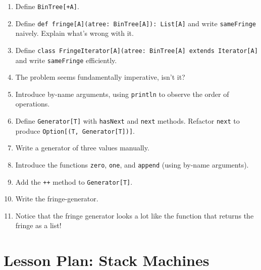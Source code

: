 \documentclass[9pt]{extbook}
\begin{document}
\begin{enumerate}

\item Define \lstinline|BinTree[+A]|.

\item Define \lstinline|def fringe[A](atree: BinTree[A]): List[A]| and write \lstinline|sameFringe| naively. Explain what's wrong with it.

\item Define \lstinline|class FringeIterator[A](atree: BinTree[A] extends Iterator[A]| and write \lstinline|sameFringe| efficiently.

\item The problem seems fundamentally imperative, isn't it?

\item Introduce by-name arguments, using \lstinline|println| to observe the order of operations.

\item Define \lstinline|Generator[T]| with \lstinline|hasNext| and \lstinline|next| methods. Refactor \lstinline|next| to produce \lstinline|Option[(T, Generator[T])]|.

\item Write a generator of three values manually.

\item Introduce the functions \lstinline|zero|, \lstinline|one|, and \lstinline|append| (using by-name arguments).

\item Add the \lstinline|++| method to \lstinline|Generator[T]|.

\item Write the fringe-generator.

\item Notice that the fringe generator looks a lot like the function that returns the fringe as a list!

\end{enumerate}  

\chapter{Lesson Plan: Stack Machines}
\end{document}
